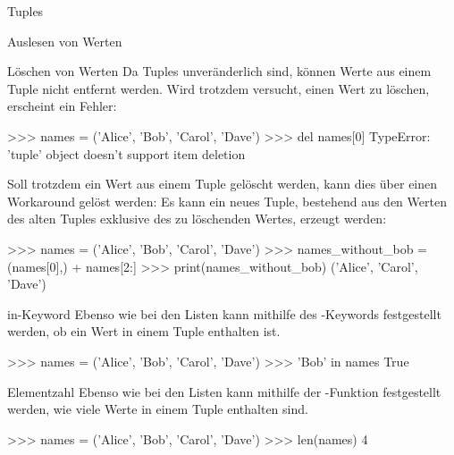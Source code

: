 \begin{subsection}{Tuples}
\begin{frame}[fragile]{Auslesen von Werten}
                           
        \end{frame}
        
        
        \begin{frame}[fragile]{Löschen von Werten}
            Da Tuples unveränderlich sind, können Werte aus einem Tuple nicht entfernt werden. Wird trotzdem versucht, einen Wert zu löschen, erscheint ein Fehler:
            
\begin{pyconcode}
>>> names = ('Alice', 'Bob', 'Carol', 'Dave')
>>> del names[0]
TypeError: 'tuple' object doesn't support item deletion
\end{pyconcode}                 
        
        Soll trotzdem ein Wert aus einem Tuple gelöscht werden, kann dies über einen Workaround gelöst werden: Es kann ein neues Tuple, bestehend aus den Werten des alten Tuples exklusive des zu löschenden Wertes, erzeugt werden:

\begin{pyconcode}
>>> names = ('Alice', 'Bob', 'Carol', 'Dave')
>>> names_without_bob = (names[0],) + names[2:]
>>> print(names_without_bob)
('Alice', 'Carol', 'Dave')
\end{pyconcode}     
                           
        \end{frame}
        
        
         \begin{frame}[fragile]{in-Keyword}
            Ebenso wie bei den Listen kann mithilfe des -Keywords festgestellt werden, ob ein Wert in einem Tuple enthalten ist.
            
\begin{pyconcode}
>>> names = ('Alice', 'Bob', 'Carol', 'Dave')
>>> 'Bob' in names
True
\end{pyconcode}                 
        
        \end{frame}
        
        
        \begin{frame}[fragile]{Elementzahl}
            Ebenso wie bei den Listen kann mithilfe der -Funktion festgestellt werden, wie viele Werte in einem Tuple enthalten sind.
            
\begin{pyconcode}
>>> names = ('Alice', 'Bob', 'Carol', 'Dave')
>>> len(names)
4
\end{pyconcode}                 
        

\end{frame}
\end{subsection}
